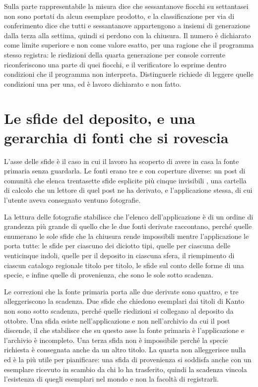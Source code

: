 Sulla parte rappresentabile la misura dice che sessantanove fiocchi su settantasei non sono portati da alcun esemplare prodotto, e la classificazione per via di conferimento dice che tutti e sessantanove appartengono a insiemi di generazione dalla terza alla settima, quindi si perdono con la chiusura. Il numero è dichiarato come limite superiore e non come valore esatto, per una ragione che il programma stesso registra: le riedizioni della quarta generazione per console corrente riconferiscono una parte di quei fiocchi, e il verificatore lo esprime dentro condizioni che il programma non interpreta. Distinguerle richiede di leggere quelle condizioni una per una, ed è lavoro dichiarato e non fatto.

\section{Le sfide del deposito, e una gerarchia di fonti che si rovescia}

L'asse delle sfide è il caso in cui il lavoro ha scoperto di avere in casa la fonte primaria senza guardarla. Le fonti erano tre e con coperture diverse: un post di comunità che elenca trentasette sfide esplicite più cinque invisibili \cite{sfide-impossibili}, una cartella di calcolo che un lettore di quel post ne ha derivato, e l'applicazione stessa, di cui l'utente aveva consegnato ventuno fotografie.

La lettura delle fotografie stabilisce che l'elenco dell'applicazione è di un ordine di grandezza più grande di quello che le due fonti derivate raccontano, perché quelle enumerano le sole sfide che la chiusura rende impossibili mentre l'applicazione le porta tutte: le sfide per ciascuno dei diciotto tipi, quelle per ciascuna delle venticinque indoli, quelle per il deposito in ciascuna sfera, il riempimento di ciascun catalogo regionale titolo per titolo, le sfide sul conto delle forme di una specie, e infine quelle di provenienza, che sono le sole sotto scadenza.

Le correzioni che la fonte primaria porta alle due derivate sono quattro, e tre alleggeriscono la scadenza. Due sfide che chiedono esemplari dai titoli di Kanto non sono sotto scadenza, perché quelle riedizioni si collegano al deposito da ottobre. Una sfida esiste nell'applicazione e non nell'archivio da cui il post discende, il che stabilisce che su questo asse la fonte primaria è l'applicazione e l'archivio è incompleto. Una terza sfida non è impossibile perché la specie richiesta è consegnata anche da un altro titolo. La quarta non alleggerisce nulla ed è la più utile per pianificare: una sfida di provenienza si soddisfa anche con un esemplare ricevuto in scambio da chi lo ha trasferito, quindi la scadenza vincola l'esistenza di quegli esemplari nel mondo e non la facoltà di registrarli.


